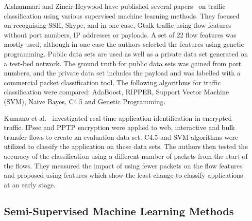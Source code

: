 Alshammari and Zincir-Heywood have published several papers~\cite{Alshammari-2009-Classifying, Alshammari-2007-flow, Alshammari-2009-Preliminary, Alshammari-2009-Machine, Alshammari-2010-Investigation, Alshammari-2011-Can} on traffic classification using various supervised machine learning methods. They focused on recognising SSH, Skype, and in one case, Gtalk traffic using flow features without port numbers, IP addresses or payloads. A set of 22 flow features was mostly used, although in one case the authors selected the features using genetic programming. Public data sets are used as well as a private data set generated on a test-bed network. The ground truth for public data sets was gained from port numbers, and the private data set includes the payload and was labelled with a commercial packet classification tool. The following algorithms for traffic classification were compared: AdaBoost, RIPPER, Support Vector Machine (SVM), Naive Bayes, C4.5 and Genetic Programming.

Kumano et al.~\cite{Kumano-2014-Towards} investigated real-time application identification in encrypted traffic. IPsec and PPTP encryption were applied to web, interactive and bulk transfer flows to create an evaluation data set. C4.5 and SVM algorithms were utilized to classify the application on these data sets. The authors then tested the accuracy of the classification using a different number of packets from the start of the flows. They measured the impact of using fewer packets on the flow features and proposed using features which show the least change to classify applications at an early stage.


\subsection{Semi-Supervised Machine Learning Methods}\label{subsec:semisupervised}

